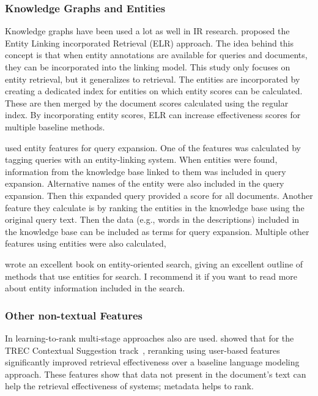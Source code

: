 \subsubsection{Knowledge Graphs and Entities}
Knowledge graphs have been used a lot as well in IR research.  proposed the Entity Linking incorporated Retrieval (ELR) approach. The idea behind this concept is that when entity annotations are available for queries and documents, they can be incorporated into the linking model. This study only focuses on entity retrieval, but it generalizes to retrieval. The entities are incorporated by creating a dedicated index for entities on which entity scores can be calculated. These are then merged by the document scores calculated using the regular index. By incorporating entity scores, ELR can increase effectiveness scores for multiple baseline methods. 

 used entity features for query expansion. One of the features was calculated by tagging queries with an entity-linking system. When entities were found, information from the knowledge base linked to them was included in query expansion. Alternative names of the entity were also included in the query expansion. Then this expanded query provided a score for all documents. Another feature they calculate is by ranking the entities in the knowledge base using the original query text. Then the data (e.g., words in the descriptions) included in the knowledge base can be included as terms for query expansion. Multiple other features using entities were also calculated, 

 wrote an excellent book on entity-oriented search, giving an excellent outline of methods that use entities for search. I recommend it if you want to read more about entity information included in the search. 

\subsubsection{Other non-textual Features}
In learning-to-rank multi-stage approaches also are used. 
 showed that for the TREC Contextual Suggestion track~\cite {contextual-suggestion-track}, reranking using user-based features significantly improved retrieval effectiveness over a baseline language modeling approach. These features show that data not present in the document's text can help the retrieval effectiveness of systems; metadata helps to rank.

